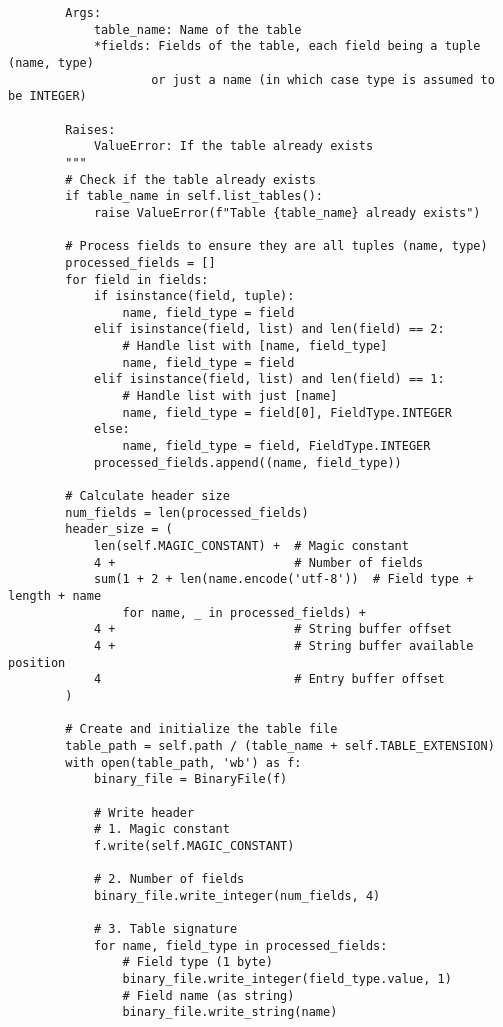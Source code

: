 \documentclass[utf8]{article}
\begin{document}
\begin{verbatim}
        Args:
            table_name: Name of the table
            *fields: Fields of the table, each field being a tuple (name, type)
                    or just a name (in which case type is assumed to be INTEGER)
        
        Raises:
            ValueError: If the table already exists
        """
        # Check if the table already exists
        if table_name in self.list_tables():
            raise ValueError(f"Table {table_name} already exists")
        
        # Process fields to ensure they are all tuples (name, type)
        processed_fields = []
        for field in fields:
            if isinstance(field, tuple):
                name, field_type = field
            elif isinstance(field, list) and len(field) == 2:
                # Handle list with [name, field_type]
                name, field_type = field
            elif isinstance(field, list) and len(field) == 1:
                # Handle list with just [name]
                name, field_type = field[0], FieldType.INTEGER
            else:
                name, field_type = field, FieldType.INTEGER
            processed_fields.append((name, field_type))
        
        # Calculate header size
        num_fields = len(processed_fields)
        header_size = (
            len(self.MAGIC_CONSTANT) +  # Magic constant
            4 +                         # Number of fields
            sum(1 + 2 + len(name.encode('utf-8'))  # Field type + length + name
                for name, _ in processed_fields) +
            4 +                         # String buffer offset
            4 +                         # String buffer available position
            4                           # Entry buffer offset
        )
        
        # Create and initialize the table file
        table_path = self.path / (table_name + self.TABLE_EXTENSION)
        with open(table_path, 'wb') as f:
            binary_file = BinaryFile(f)
            
            # Write header
            # 1. Magic constant
            f.write(self.MAGIC_CONSTANT)
            
            # 2. Number of fields
            binary_file.write_integer(num_fields, 4)
            
            # 3. Table signature
            for name, field_type in processed_fields:
                # Field type (1 byte)
                binary_file.write_integer(field_type.value, 1)
                # Field name (as string)
                binary_file.write_string(name)
            

\end{verbatim}
\end{document}
